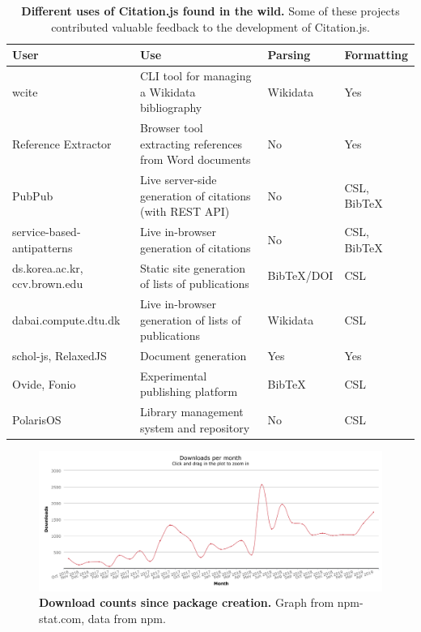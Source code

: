 \documentclass[fleqn,10pt,lineno]{wlpeerj} %
\begin{document}
\begin{table}[bt]
\caption{\textbf{Different uses of Citation.js found in the wild.} Some of these projects contributed valuable feedback to the development of Citation.js.}
\label{table:uses}
\begin{tabular}{|p{3cm}|p{6cm}|l|l|}
\hline
\textbf{User}       & \textbf{Use}                                             & \textbf{Parsing} & \textbf{Formatting} \\ \hline
wcite \citep{Voß2019wikicite/wcite} & CLI tool for managing a Wikidata bibliography            & Wikidata         & Yes                 \\ \hline
Reference Extractor \citep{Zelle2018rmzelle/ref-extractor} & Browser tool extracting references from Word documents   & No               & Yes                 \\ \hline
PubPub \citep{shihipar_pubpub:_2018} & Live server-side generation of citations (with REST API) & No               & CSL, BibTeX         \\ \hline
service-based-antipatterns \citep{Boceck2019xJREB/service-based-antipatterns} & Live in-browser generation of citations                  & No               & CSL, BibTeX         \\ \hline
ds.korea.ac.kr, ccv.brown.edu & Static site generation of lists of publications          & BibTeX/DOI       & CSL                 \\ \hline
dabai.compute.dtu.dk          & Live in-browser generation of lists of publications      & Wikidata         & CSL                 \\ \hline
schol-js, RelaxedJS \citep{null2018schol-js/schol,null2018RelaxedJS/ReLaXed} & Document generation                                      & Yes              & Yes                 \\ \hline
Ovide, Fonio \citep{Mourat2019peritext/ovide,Mourat2019medialab/fonio} & Experimental publishing platform                         & BibTeX           & CSL                 \\ \hline
PolarisOS \citep{Ribeyre2019MyScienceWork/PolarisOS} & Library management system and repository                 & No               & CSL                 \\ \hline
\end{tabular}
\end{table}

\begin{figure}[bt]
\centering
\includegraphics[width=\linewidth]{figures/download_counts.png}
\caption{\textbf{Download counts since package creation.} Graph from npm-stat.com, data from npm.}
\label{fig:downloads}
\end{figure}
\end{document}
